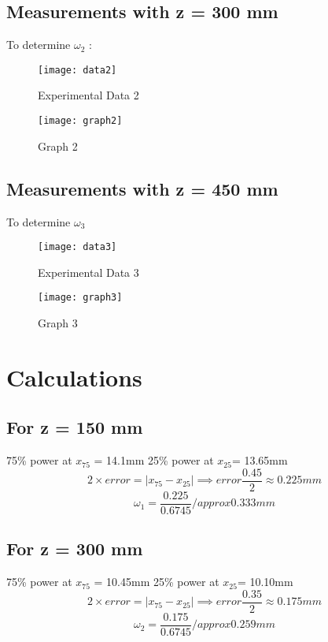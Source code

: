 \documentclass[
	letterpaper, %
	10pt, %
]{CSUniSchoolLabReport}
\begin{document}
\subsection{Measurements with z = 300 mm}
To determine \(\omega_2\) :
\begin{figure}[H] %
	\centering %
	\texttt{[image: data2]} %
	\caption{Experimental Data 2}
\end{figure}
\begin{figure}[H] %
	\centering %
	\texttt{[image: graph2]} %
	\caption{Graph 2}
\end{figure}
\newpage
\subsection{Measurements with z = 450 mm}
To determine \(\omega_3\) 
\begin{figure}[H] %
	\centering %
	\texttt{[image: data3]} %
	\caption{Experimental Data 3}
\end{figure}
\begin{figure}[H] %
	\centering %
	\texttt{[image: graph3]} %
	\caption{Graph 3}
\end{figure}
\section{Calculations}
\subsection{For z = 150 mm}
75\% power at $x_{75} $ = 14.1mm
25\% power at $x_{25} $= 13.65mm
\[
	2 \times error = \left\vert x_{75} - x_{25}\right\vert \implies error  \frac{0.45}{2}  \approx 0.225 mm
\]
\[
	\omega_1 = \frac{0.225}{0.6745} /approx 0.333 mm
\]
\subsection{For z = 300 mm}
75\% power at $x_{75} $ = 10.45mm
25\% power at $x_{25} $= 10.10mm
\[
	2 \times error = \left\vert x_{75} - x_{25}\right\vert \implies error  \frac{0.35}{2}  \approx 0.175 mm
\]
\[
	\omega_2 = \frac{0.175}{0.6745} /approx 0.259 mm
\]
\end{document}
